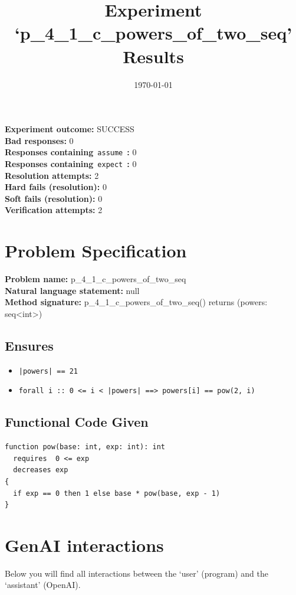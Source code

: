\documentclass{article}
\begin{document}
\title{Experiment `p\_4\_1\_c\_powers\_of\_two\_seq' Results}
\author{\today}
\date{}
\maketitle
\textbf{Experiment outcome: }SUCCESS
\\\textbf{Bad responses: }0
\\\textbf{Responses containing}~\texttt{assume}~\textbf{: }0
\\\textbf{Responses containing}~\texttt{expect}~\textbf{: }0
\\\textbf{Resolution attempts: }2
\\\textbf{Hard fails (resolution): }0
\\\textbf{Soft fails (resolution): }0
\\\textbf{Verification attempts: }2
\section*{Problem Specification}
\textbf{Problem name: }p\_4\_1\_c\_powers\_of\_two\_seq
\\\textbf{Natural language statement: }null
\\\textbf{Method signature: }p\_4\_1\_c\_powers\_of\_two\_seq() returns (powers: seq<int>)
\subsection*{Ensures}
\begin{itemize}
\item \texttt{|powers| == 21}
\item \texttt{forall i :: 0 <= i < |powers| ==> powers[i] == pow(2, i)}
\end{itemize}
\subsection*{Functional Code Given}
\begin{lstlisting}
function pow(base: int, exp: int): int
  requires  0 <= exp
  decreases exp
{
  if exp == 0 then 1 else base * pow(base, exp - 1)
}
\end{lstlisting}
\clearpage
\section*{GenAI interactions}
Below you will find all interactions between the `user' (program) and the `assistant' (OpenAI).
\end{document}
